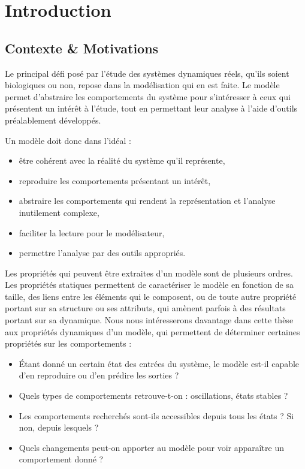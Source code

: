 
\chapter{Introduction}

\section{Contexte \& Motivations}

Le principal défi posé par l'étude des systèmes dynamiques réels,
qu'ils soient biologiques ou non,
repose dans la modélisation qui en est faite.
Le modèle permet d'abstraire les comportements du système
pour s'intéresser à ceux qui présentent un intérêt à l'étude,
tout en permettant leur analyse à l'aide d'outils préalablement développés.

Un modèle doit donc dans l'idéal :
\begin{itemize}
  \item être cohérent avec la réalité du système qu'il représente,
  \item reproduire les comportements présentant un intérêt,
  \item abstraire les comportements qui rendent la représentation et l'analyse inutilement
    complexe,
  \item faciliter la lecture pour le modélisateur,
  \item permettre l'analyse par des outils appropriés.
\end{itemize}

Les propriétés qui peuvent être extraites d'un modèle sont de plusieurs ordres.
Les propriétés statiques permettent de caractériser le modèle
en fonction de sa taille,
des liens entre les éléments qui le composent,
ou de toute autre propriété portant sur sa structure ou ses attributs,
qui amènent parfois à des résultats portant sur sa dynamique.
Nous nous intéresserons davantage dans cette thèse aux propriétés dynamiques d'un modèle,
qui permettent de déterminer certaines propriétés sur les comportements :
\begin{itemize}
  \item Étant donné un certain état des entrées du système, le modèle est-il capable
    d'en reproduire ou d'en prédire les sorties ?
  \item Quels types de comportements retrouve-t-on : oscillations, états stables ?
  \item Les comportements recherchés sont-ils accessibles depuis tous les états ?
    Si non, depuis lesquels ?
  \item Quels changements peut-on apporter au modèle pour voir apparaître un comportement donné ?
\end{itemize}

